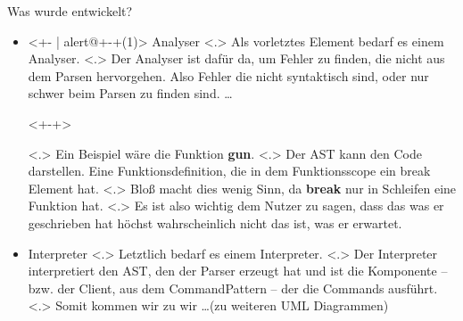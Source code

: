 \begin{frame}{Was wurde entwickelt?}
\begin{itemize}[<+- | alert@+>]
{            }%
      \item<+- | alert@+-+(1)>
        Analyser%
            \note[item]<.>{
              Als vorletztes Element bedarf es einem Analyser.
            }
            \note[item]<.>{
              Der Analyser ist dafür da, um Fehler zu finden, die nicht aus dem Parsen hervorgehen. Also Fehler die nicht syntaktisch sind, oder nur schwer beim Parsen zu finden sind.
              \ldots
            }
        \begin{uncoverenv}<+-+>%
        \end{uncoverenv}
            \note[item]<.>{
              Ein Beispiel wäre die Funktion \textbf{gun}.
              }
            \note[item]<.>{
              Der AST kann den Code darstellen. Eine Funktionsdefinition, die in dem Funktionsscope ein break Element hat.
            }
            \note[item]<.>{
              Bloß macht dies wenig Sinn, da \textbf{break} nur in Schleifen eine Funktion hat.
            }
            \note[item]<.>{
              Es ist also wichtig dem Nutzer zu sagen, dass das was er geschrieben hat höchst wahrscheinlich nicht das ist, was er erwartet.
            }
      \item
        Interpreter
            \note[item]<.>{
              Letztlich bedarf es einem Interpreter.
            }
            \note[item]<.>{
              Der Interpreter interpretiert den AST, den der Parser erzeugt hat und ist die Komponente -- bzw. der Client, aus dem CommandPattern -- der die Commands ausführt.
            }
            \note[item]<.>{
              Somit kommen wir zu wir \ldots (zu weiteren UML Diagrammen)
            }
    \end{itemize}
  \end{frame}

